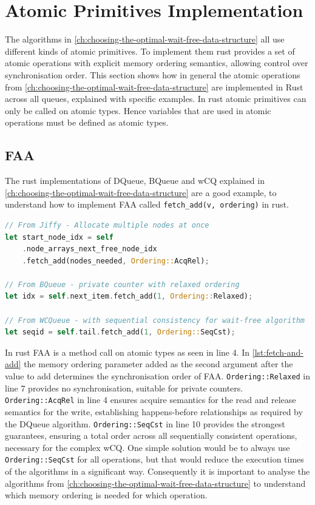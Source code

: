 \section{Atomic Primitives Implementation}

The algorithms in \cref{ch:choosing-the-optimal-wait-free-data-structure} all use different kinds of atomic primitives. To implement them rust provides a set of atomic operations with explicit memory ordering semantics, allowing control over synchronisation order. This section shows how in general the atomic operations from \cref{ch:choosing-the-optimal-wait-free-data-structure} are implemented in Rust across all queues, explained with specific examples. In rust atomic primitives can only be called on atomic types. Hence variables that are used in atomic operations must be defined as atomic types.

\subsection{\acf{FAA}}

The rust implementations of DQueue, BQueue and \ac{wCQ} explained in \cref{ch:choosing-the-optimal-wait-free-data-structure} are a good example, to understand how to implement \ac{FAA} called \texttt{fetch\_add(v, ordering)} in rust.

\begin{lstlisting}[language=Rust, style=boxed, caption={Fetch-and-add with different memory orderings}, label={lst:fetch-and-add}]
// From Jiffy - Allocate multiple nodes at once
let start_node_idx = self
    .node_arrays_next_free_node_idx
    .fetch_add(nodes_needed, Ordering::AcqRel);

// From BQueue - private counter with relaxed ordering
let idx = self.next_item.fetch_add(1, Ordering::Relaxed);

// From WCQueue - with sequential consistency for wait-free algorithm
let seqid = self.tail.fetch_add(1, Ordering::SeqCst);
\end{lstlisting}

In rust \ac{FAA} is a method call on atomic types as seen in line 4. In \cref{lst:fetch-and-add} the memory ordering parameter added as the second argument after the value to add determines the synchronisation order of \ac{FAA}. \texttt{Ordering::Relaxed} in line 7 provides no synchronisation, suitable for private counters. \texttt{Ordering::AcqRel} in line 4 ensures acquire semantics for the read and release semantics for the write, establishing happens-before relationships as required by the DQueue algorithm. \texttt{Ordering::SeqCst} in line 10 provides the strongest guarantees, ensuring a total order across all sequentially consistent operations, necessary for the complex \ac{wCQ}. One simple solution would be to always use \texttt{Ordering::SeqCst} for all operations, but that would reduce the execution times of the algorithms in a significant way. Consequently it is important to analyse the algorithms from \cref{ch:choosing-the-optimal-wait-free-data-structure} to understand which memory ordering is needed for which operation.

